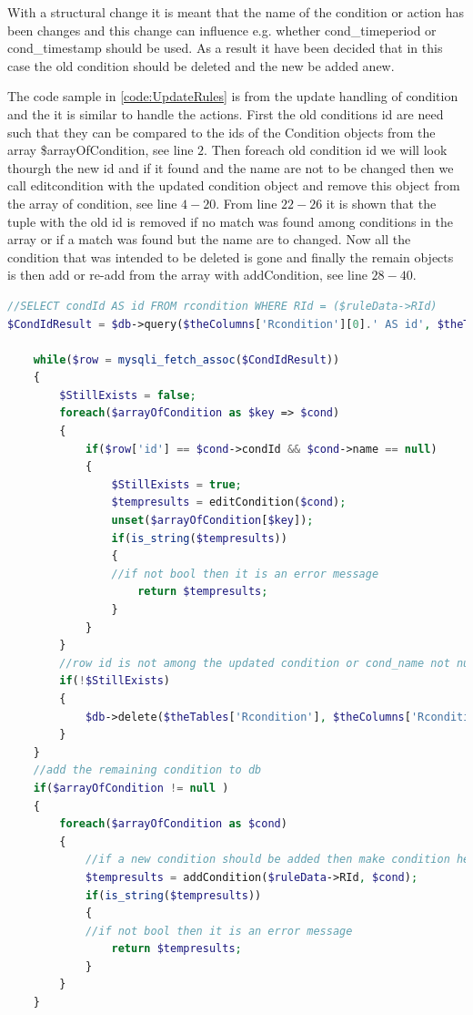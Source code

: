 With a structural change it is meant that the name of the condition or action has been changes and this change can influence e.g. whether cond\_timeperiod or cond\_timestamp should be used. As a result it have been decided that in this case the old condition should be deleted and the new be added anew. 

The code sample in \ref{code:UpdateRules} is from the update handling of condition and the it is similar to handle the actions. First the old conditions id are need such that they can be compared to the ids of the Condition objects from the array \$arrayOfCondition, see line $2$. 
Then foreach old condition id we will look thourgh the new id and if it found and the name are not to be changed then we call editcondition with the updated condition object and remove this object from the array of condition, see line $4-20$. 
From line $22-26$ it is shown that the tuple with the old id is removed if no match was found among conditions in the array or if a match was found but the name are to changed. Now all the condition that was intended to be deleted is gone and finally the remain objects is then add or re-add from the array with addCondition, see line $28-40$.


\begin{lstlisting}[language=PHP, label=code:UpdateRules, caption=editRule code sample]
//SELECT condId AS id FROM rcondition WHERE RId = ($ruleData->RId)
$CondIdResult = $db->query($theColumns['Rcondition'][0].' AS id', $theTables['Rcondition'], $theColumns['Rcondition'][1] . " = " . $ruleData->RId );
				
	while($row = mysqli_fetch_assoc($CondIdResult))
	{
		$StillExists = false;
		foreach($arrayOfCondition as $key => $cond)
		{
			if($row['id'] == $cond->condId && $cond->name == null)				//edit the condition in db
			{
				$StillExists = true;
				$tempresults = editCondition($cond);
				unset($arrayOfCondition[$key]);
				if(is_string($tempresults))
				{
				//if not bool then it is an error message
					return $tempresults;
				}
			}	
		}
		//row id is not among the updated condition or cond_name not null so delete 
		if(!$StillExists)
		{
			$db->delete($theTables['Rcondition'], $theColumns['Rcondition'][0] . " = " .$row['id']);
		}
	}
	//add the remaining condition to db
	if($arrayOfCondition != null )
	{
		foreach($arrayOfCondition as $cond)
		{
			//if a new condition should be added then make condition here
			$tempresults = addCondition($ruleData->RId, $cond);
			if(is_string($tempresults))
			{
			//if not bool then it is an error message
				return $tempresults;
			}
		}
	}
\end{lstlisting}


